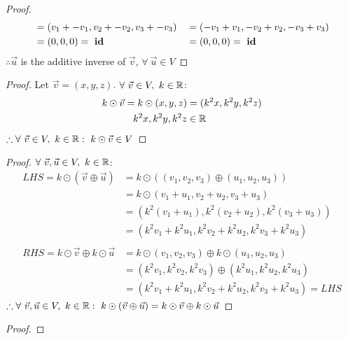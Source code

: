 \begin{enumerate}
\begin{proof}
\begin{align*}
                             & = (v_1+-v_1,v_2+-v_2,v_3+-v_3)          &                        & = (-v_1+v_1,-v_2+v_2,-v_3+v_3)          \\
                             & = (0,0,0) =~\text{\textbf{id}}             &                        & = (0,0,0) =~\text{\textbf{id}}
    \end{align*}
    $\therefore \vec{u}$ is the additive inverse of $\vec{v}$, $\forall~\vec{u} \in V$
  \end{proof}
  \begin{proof}
    Let $\vec{v}=(x,y,z)$. $\forall~\vec{v} \in V,~k \in \mathbb{R}$:
    \begin{align*}
      k \odot \vec{v} = k \odot (x,y,z) & = (k^2x,k^2y,k^2z) \\
      k^2x,k^2y,k^2z                    & \in \mathbb{R}
    \end{align*}
    $\therefore \forall~\vec{v} \in V,~k \in \mathbb{R}:~k \odot \vec{v} \in V$
  \end{proof}
  \begin{proof}
    $\forall~\vec{v},\vec{u} \in V,~k \in \mathbb{R}$:
    \begin{align*}
      LHS = k \odot (\vec{v} \oplus \vec{u})       & = k \odot ((v_1,v_2,v_3) \oplus (u_1,u_2,u_3))         \\
                                                   & = k \odot (v_1+u_1,v_2+u_2,v_3+u_3)                    \\
                                                   & = (k^2(v_1+u_1), k^2(v_2+u_2), k^2(v_3+u_3))           \\
                                                   & = (k^2v_1+k^2u_1,k^2v_2+k^2u_2,k^2v_3+k^2u_3)          \\ \\
      RHS = k \odot \vec{v} \oplus k \odot \vec{u} & = k \odot (v_1,v_2,v_3) \oplus k \odot (u_1,u_2,u_3)   \\
                                                   & = (k^2v_1,k^2v_2,k^2v_3) \oplus (k^2u_1,k^2u_2,k^2u_3) \\
                                                   & = (k^2v_1+k^2u_1,k^2v_2+k^2u_2,k^2v_3+k^2u_3) = LHS
    \end{align*}
    $\therefore \forall~\vec{v},\vec{u} \in V,~k \in \mathbb{R}:~k \odot (\vec{v} \oplus \vec{u}) = k \odot \vec{v} \oplus k \odot \vec{u}$
  \end{proof}
  \begin{proof}

\end{proof}
\end{enumerate}
